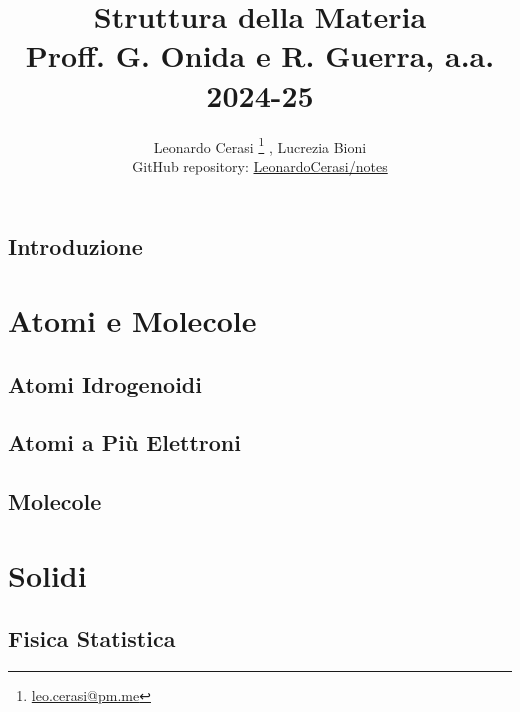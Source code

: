 \documentclass[a4paper, 12pt]{book}
\title{\Huge\textbf{Struttura della Materia} \\ \large Proff. G. Onida e R. Guerra, a.a. 2024-25}
\author{Leonardo Cerasi%
	\thanks{\scriptsize\href{mailto:leonardo.cerasi@studenti.unimi.it}{leo.cerasi@pm.me}}%
	, Lucrezia Bioni\\
	\small GitHub repository: \href{https://github.com/LeonardoCerasi/notes}{LeonardoCerasi/notes}}
\begin{document}
\frontmatter

\maketitle
\tableofcontents
\pagestyle{indice}

\mainmatter

\chapter*{Introduzione}
\pagestyle{introd}


\part{Atomi e Molecole}
\pagestyle{body}

\chapter{Atomi Idrogenoidi}


\chapter{Atomi a Più Elettroni}


\chapter{Molecole}


\part{Solidi}
\pagestyle{body}

\chapter{Fisica Statistica}

\end{document}
